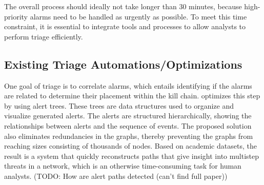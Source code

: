 The overall process should ideally not take longer than 30 minutes, because high-priority alarms need to be handled as
urgently as possible.
To meet this time constraint, it is essential to integrate tools and processes to allow analysts to perform triage
efficiently.

\subsection{Existing Triage Automations/Optimizations}
\label{subsec:rq1-existing-optimizations}

One goal of triage is to correlate alarms, which entails identifying if the alarms are related to determine their
placement within the kill chain.
\citet{ficke2022reconstructing} optimizes this step by using alert trees.
These trees are data structures used to organize and visualize generated alerts.
The alerts are structured hierarchically, showing the relationships between alerts and the sequence of events.
The proposed solution also eliminates redundancies in the graphs, thereby preventing the graphs from reaching sizes
consisting of thousands of nodes.
Based on academic datasets, the result is a system that quickly reconstructs paths that give insight into multistep
threats in a network, which is an otherwise time-consuming task for human analysts.
(TODO: How are alert paths detected (can't find full paper)) %

